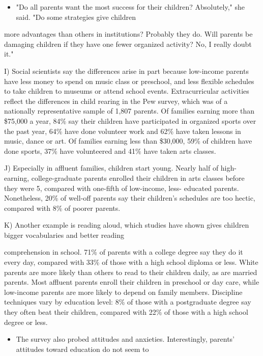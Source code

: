 \documentclass[UTF8,11pt]{ctexart}
\begin{document}
\begin{itemize}[leftmargin=2em,itemsep=.2em,topsep=.4em]\item[H.] "Do all parents want the most success for their children? Absolutely," she said. "Do some strategies give children
\end{itemize}

more advantages than others in institutions? Probably they do. Will parents be damaging children if they have one fewer organized activity? No, I really doubt it."


I) Social scientists say the differences arise in part because low-income parents have less money to spend on music class or preschool, and less flexible schedules to take children to museums or attend school events. Extracurricular activities reflect the differences in child rearing in the Pew survey, which was of a nationally representative sample of 1,807 parents. Of families earning more than \$75,000 a year, 84\% say their children have participated in organized sports over the past year, 64\% have done volunteer work and 62\% have taken lessons in music, dance or art. Of families earning less than \$30,000, 59\% of children have done sports, 37\% have volunteered and 41\% have taken arts classes.


J) Especially in affluent families, children start young. Nearly half of high-earning, college-graduate parents enrolled their children in arts classes before they were 5, compared with one-fifth of low-income, less- educated parents. Nonetheless, 20\% of well-off parents say their children's schedules are too hectic, compared with 8\% of poorer parents.


K) Another example is reading aloud, which studies have shown gives children bigger vocabularies and better reading


comprehension in school. 71\% of parents with a college degree say they do it every day, compared with 33\% of those with a high school diploma or less. White parents are more likely than others to read to their children daily, as are married parents. Most affluent parents enroll their children in preschool or day care, while low-income parents are more likely to depend on family members. Discipline techniques vary by education level: 8\% of those with a postgraduate degree say they often beat their children, compared with 22\% of those with a high school degree or less.


\begin{itemize}[leftmargin=2em,itemsep=.2em,topsep=.4em]\item[L.] The survey also probed attitudes and anxieties. Interestingly, parents' attitudes toward education do not seem to
\end{itemize}
\end{document}
